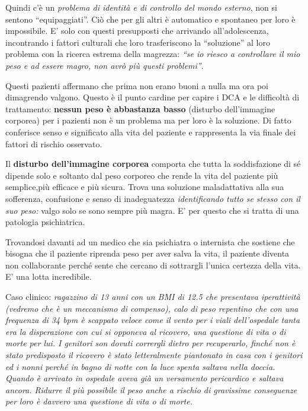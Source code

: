 Quindi c'è un \emph{problema di identità e di controllo del mondo
esterno}, non si sentono ``equipaggiati''. Ciò che per gli altri è
automatico e spontaneo per loro è impossibile. E' solo con questi
presupposti che arrivando all'adolescenza, incontrando i fattori
culturali che loro trasferiscono la ``soluzione'' al loro problema con
la ricerca estrema della magrezza: \emph{``se io riesco a controllare il
mio peso e ad essere magro, non avrò più questi problemi''}.

Questi pazienti affermano che prima non erano buoni a nulla ma ora poi
dimagrendo valgono. Questo è il punto cardine per capire i DCA e le
difficoltà di trattamento: \textbf{nessun peso è abbastanza basso}
(disturbo dell'immagine corporea) per i pazienti non è un problema ma
per loro è la soluzione. Di fatto conferisce senso e significato alla
vita del paziente e rappresenta la via finale dei fattori di rischio
osservato.

Il \textbf{disturbo dell'immagine corporea} comporta che tutta la
soddisfazione di sé dipende solo e soltanto dal peso corporeo che rende
la vita del paziente più semplice,più efficace e più sicura. Trova una
soluzione maladattativa alla sua sofferenza, confusione e senso di
inadeguatezza \emph{identificando tutto se stesso con il suo peso:}
valgo solo se sono sempre più magra. E' per questo che si tratta di una
patologia psichiatrica.

Trovandosi davanti ad un medico che sia psichiatra o internista che
sostiene che bisogna che il paziente riprenda peso per aver salva la
vita, il paziente diventa non collaborante perché sente che cercano di
sottrargli l'unica certezza della vita. E' una lotta incredibile.

Caso clinico: \emph{ragazzino di 13 anni con un BMI di 12.5 che
presentava iperattività (vedremo che è un meccanismo di compenso), calo
di peso repentino che con una frequenza di 34 bpm è scappato veloce come
il vento per i viali dell'ospedale tanta era la disperazione con cui si
opponeva al ricovero, una questione di vita o di morte per lui. I
genitori son dovuti corrergli dietro per recuperarlo, finché non è stato
predisposto il ricovero è stato letteralmente piantonato in casa con i
genitori ed i nonni perché in bagno di notte con la luce spenta saltava
nella doccia. Quando è arrivato in ospedale aveva già un versamento
pericardico e saltava ancora. Ridurre il più possibile il peso anche a
rischio di gravissime conseguenze per loro è davvero una questione di
vita o di morte.}


